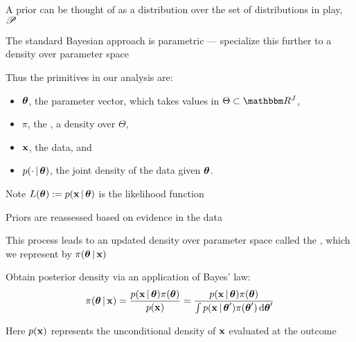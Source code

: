 \begin{frame}
    
    \vspace{2em}
    A prior can be thought of as a
    distribution over the set of distributions in play, $\mathscr P$ 
    
    \vspace{.7em}
    The standard
    Bayesian approach is parametric --- specialize this further to a
    density over parameter space
    
    \vspace{.7em}
    Thus the primitives in our analysis are:
    \begin{itemize}
        \item ${\boldsymbol \theta}$, the parameter vector, which takes values in $\Theta
            \subset \RR^J$,
        \item $\pi$, the , a density over $\Theta$,
        \item ${\mathbf x}$, the data, and
        \item $p(\cdot \, | \, {\boldsymbol \theta})$, the joint density of the data given
            ${\boldsymbol \theta}$.
    \end{itemize}
    Note $L({\boldsymbol \theta}) := p({\mathbf x} \, | \, {\boldsymbol \theta})$ is the likelihood
    function
    
\end{frame}

\begin{frame}

    \vspace{2em}
    Priors are reassessed based on evidence in the data
    
    \vspace{.7em}
    This process leads to an updated density over parameter space 
    called the , which we represent
    by $\pi({\boldsymbol \theta} \, | \, {\mathbf x})$
    
    \vspace{.7em}
    Obtain posterior density
    via an application of Bayes' law:
    \begin{equation}
        \label{eq:brstat}
        \pi({\boldsymbol \theta} \, | \, {\mathbf x}) 
        = \frac{p({\mathbf x} \, | \, {\boldsymbol \theta}) \pi({\boldsymbol \theta})}
        {p({\mathbf x})}
        = \frac{p({\mathbf x} \, | \, {\boldsymbol \theta}) \pi({\boldsymbol \theta})}
        {\int p({\mathbf x} \, | \, {\boldsymbol \theta}') \pi({\boldsymbol \theta}') \mathop{}\!\mathrm{d} {\boldsymbol \theta}'}
    \end{equation}
    
    Here $p({\mathbf x})$ represents the unconditional density of ${\mathbf x}$
    evaluated at the outcome
    
\end{frame}

